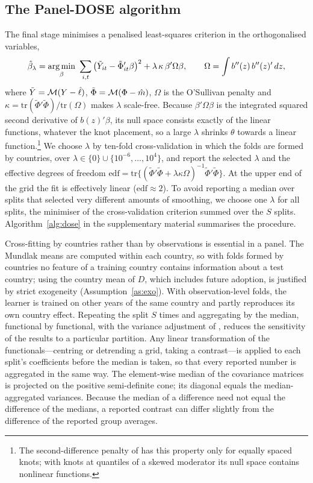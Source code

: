 \documentclass[preprint,12pt,authoryear]{elsarticle}
\begin{document}
\subsection{The Panel-DOSE algorithm}

The final stage minimises a penalised least-squares criterion in the orthogonalised variables,
\begin{equation}
\hat\beta_\lambda=\argmin_\beta \ \sum_{i,t}\big(\tilde Y_{it}-\tilde\Phi_{it}'\beta\big)^2+\lambda\,\kappa\,\beta'\Omega\beta,\qquad \Omega=\int b''(z)\,b''(z)'\,dz,
\label{eq:pls}
\end{equation}
where $\tilde Y=\mathcal{M}(Y-\hat\ell)$, $\tilde\Phi=\mathcal{M}(\Phi-\hat m)$, $\Omega$ is the O'Sullivan penalty \citep{osullivan1986,wand2008osullivan} and $\kappa=\mathrm{tr}(\tilde\Phi'\tilde\Phi)/\mathrm{tr}(\Omega)$ makes $\lambda$ scale-free. Because $\beta'\Omega\beta$ is the integrated squared second derivative of $b(z)'\beta$, its null space consists exactly of the linear functions, whatever the knot placement, so a large $\lambda$ shrinks $\theta$ towards a linear function.\footnote{The second-difference penalty of \citet{eilers1996} has this property only for equally spaced knots; with knots at quantiles of a skewed moderator its null space contains nonlinear functions.} We choose $\lambda$ by ten-fold cross-validation in which the folds are formed by countries, over $\lambda\in\{0\}\cup\{10^{-6},\dots,10^{4}\}$, and report the selected $\lambda$ and the effective degrees of freedom $\mathrm{edf}=\mathrm{tr}\{(\tilde\Phi'\tilde\Phi+\lambda\kappa\Omega)^{-1}\tilde\Phi'\tilde\Phi\}$. At the upper end of the grid the fit is effectively linear ($\mathrm{edf}\approx2$). To avoid reporting a median over splits that selected very different amounts of smoothing, we choose one $\lambda$ for all splits, the minimiser of the cross-validation criterion summed over the $S$ splits. Algorithm~\ref{alg:dose} in the supplementary material summarises the procedure.

Cross-fitting by countries rather than by observations is essential in a panel. The Mundlak means are computed within each country, so with folds formed by countries no feature of a training country contains information about a test country; using the country mean of $D$, which includes future adoption, is justified by strict exogeneity (Assumption~\ref{as:exo}). With observation-level folds, the learner is trained on other years of the same country and partly reproduces its own country effect. Repeating the split $S$ times and aggregating by the median, functional by functional, with the variance adjustment of \citet{chernozhukov2018dml}, reduces the sensitivity of the results to a particular partition. Any linear transformation of the functionals---centring or detrending a grid, taking a contrast---is applied to each split's coefficients before the median is taken, so that every reported number is aggregated in the same way. The element-wise median of the covariance matrices is projected on the positive semi-definite cone; its diagonal equals the median-aggregated variances. Because the median of a difference need not equal the difference of the medians, a reported contrast can differ slightly from the difference of the reported group averages.
\end{document}
